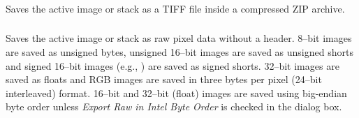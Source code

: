 \subsubsection{\protect{}\label{sub:Zip...}}

Saves the active image or stack as a TIFF file inside a compressed
ZIP archive.


\subsubsection{\protect{}\label{sub:Raw-Data...}}

Saves the active image or stack as raw pixel data without a header.
8--bit images are saved as unsigned bytes, unsigned 16--bit images
are saved as unsigned shorts and signed 16--bit images (e.g., )
are saved as signed shorts. 32--bit images are saved as floats and
RGB images are saved in three bytes per pixel (24--bit interleaved)
format. 16--bit and 32--bit (float) images are saved using big-endian
byte order unless \emph{Export Raw in Intel Byte Order} is checked
in the 
dialog box.


\subsubsection[\protect\userinterface{Image Sequence\ldots{}}]{\protect{}\label{sub:SaveAs>Image-Seq...}}

